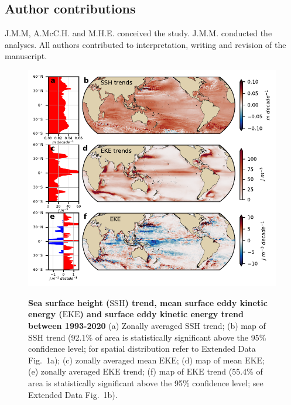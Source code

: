 \documentclass{nature}
\newcommand{\EKE}{\text{EKE}}
\newcommand{\SSH}{\text{SSH}}
\begin{document}
\subsection{Author contributions}\mbox{}\vspace{-1.5em}

J.M.M, A.McC.H. and M.H.E. conceived the study. J.M.M. conducted the analyses. All authors contributed to interpretation, writing and revision of the manuscript.

\newpage


\begin{figure}
    \centering
	\includegraphics[width=\textwidth]{./figures/global_trend_WBC_GW_nsignif.pdf}\\
	\caption{\textbf{Sea surface height ($\SSH$) trend, mean surface eddy kinetic energy ($\EKE$) and surface eddy kinetic energy trend between 1993-2020} (a) Zonally averaged $\SSH$ trend; (b) map of $\SSH$ trend (92.1\% of area is statistically significant above the 95\% confidence level; for spatial distribution refer to Extended Data Fig.~1a); (c) zonally averaged mean $\EKE$; (d) map of mean $\EKE$; (e) zonally averaged $\EKE$ trend; (f) map of $\EKE$ trend (55.4\% of area is statistically significant above the 95\% confidence level; see Extended Data Fig.~1b). \label{fig:global_trends}}
\end{figure}
\end{document}
